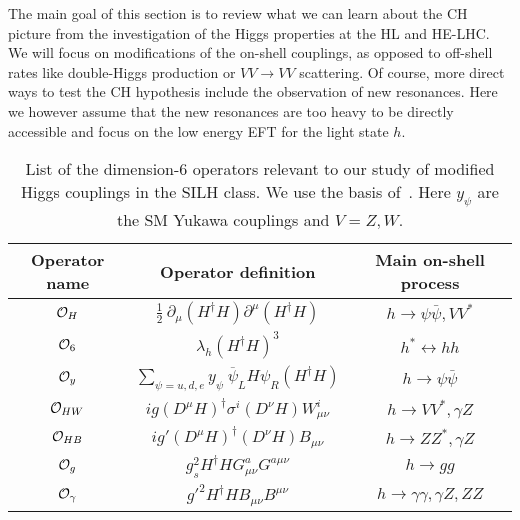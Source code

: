The main goal of this section is to review what we can learn about the CH picture from the investigation of the Higgs properties at the HL and HE-LHC. We will focus on modifications of the on-shell couplings, as opposed to off-shell rates like double-Higgs production or $VV\to VV$ scattering. Of course, more direct ways to test the CH hypothesis include the observation of new resonances. Here we however assume that the new resonances are too heavy to be directly accessible and focus on the low energy EFT for the light state $h$.









\begin{table}[t]
\caption{\small List of the dimension-6 operators relevant to our study of modified Higgs couplings in the SILH class. We use the basis of~\cite{Giudice:2007fh}. Here $y_\psi$ are the SM Yukawa couplings and $V=Z,W$. %
\label{tab1}}
\begin{center}
{
\begin{tabular}{c|c|c} 
\rule{0pt}{1.2em}%
Operator name & Operator definition & Main on-shell process \\
\hline
${\cal O}_H$ & $\frac{1}{2}~\partial_\mu(H^\dagger H)\partial^\mu(H^\dagger H)$ & $h\to\psi\bar\psi, VV^*$     \\
${\cal O}_6$ & $\lambda_h(H^\dagger H)^3$ & $h^*\leftrightarrow hh$   \\
${\cal O}_y$ & $\sum_{\psi=u,d,e} y_\psi~\overline\psi_L H\psi_R(H^\dagger H)$ & $h\to\psi\bar\psi$   \\
\hline
%
${\cal O}_{HW}$ & $ig(D^\mu H)^\dagger\sigma^i(D^\nu H)W_{\mu\nu}^i$ & $h\to VV^*,\gamma Z$   \\
${\cal O}_{HB}$ & $ig'(D^\mu H)^\dagger(D^\nu H)B_{\mu\nu}$ & $h\to ZZ^*,\gamma Z$  \\
\hline
${\cal O}_{g}$ & $g_s^2H^\dagger H G^a_{\mu\nu}G^{a\mu\nu}$ & $h\to gg$   \\
${\cal O}_{\gamma}$ & $g'^2H^\dagger HB_{\mu\nu}B^{\mu\nu}$ & $h\to \gamma\gamma,\gamma Z,ZZ$  
%
\end{tabular}
}
\end{center}
\end{table}
